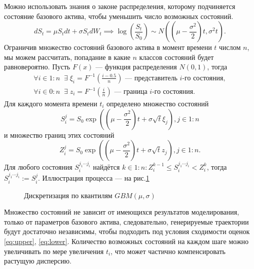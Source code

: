 \documentclass[specialist,
               substylefile = spbu.rtx,
               subf,href,colorlinks=true, 12pt]{disser}
\begin{document}
	        Можно использовать знания о законе распределения, которому подчиняется состояние базового актива, чтобы уменьшить число возможных состояний.
	        $$dS_t = \mu S_t dt + \sigma S_t dW_t \implies \log \left(\frac{S_t}{S_0}\right)\sim N\left(\left(\mu - \frac{\sigma^2}{2}\right)t, \sigma^2 t\right).$$
	        Ограничив множество состояний базового актива в момент времени $t$ числом $n$, мы можем рассчитать, попадание в какие $n$ классов состояний будет равновероятно. Пусть $F(x)$ --- функция распределения $N\left(0, 1\right)$, тогда
	        \begin{align}
	            \forall i \in 1:n \;\;\exists\; \xi_i = F^{-1}\left(\frac{i-0.5}{n}\right) \text{ --- представитель $i$-го состояния} ,\\
	            \forall i \in 0:n \;\;\exists\; z_i = F^{-1}\left(\frac{i}{n}\right) \text{ --- граница $i$-го состояния} .
	        \end{align}
	        Для каждого момента времени $t_i$ определено множество состояний $$S_i^j = S_0\exp\left(\left(\mu - \frac{\sigma^2}{2}\right)t + \sigma \sqrt{t}\xi_j\right), j\in 1:n$$ и множество границ этих состояний $$Z_i^j = S_0\exp\left(\left(\mu - \frac{\sigma^2}{2}\right)t + \sigma \sqrt{t}z_j\right), j\in 1:n.$$
	        Для любого состояния $S_i^{j_1\cdots j_i}$ найдётся $k\in 1:n : Z_i^{k-1} \leq S_i^{j_1\cdots j_i} < Z_i^k$, тогда $S_i^{j_1\cdots j_i} := S_i^j$. Иллюстрация процесса --- на рис.\ref{fig:grid}
	        \begin{figure}[h]
        	    \centering
        		\caption{Дискретизация по квантилям $GBM(\mu, \sigma)$}
        		\label{fig:grid}
        	\end{figure}
	        Множество состояний не зависит от имеющихся результатов моделирования, только от параметров базового актива, следовательно, генерируемые траектории будут достаточно независимы, чтобы подходить под условия сходимости оценок \eqref{eq:upper}, \eqref{eq:lower}. Количество возможных состояний на каждом шаге можно увеличивать по мере увеличения $t_i$, что может частично компенсировать растущую дисперсию.
\end{document}
